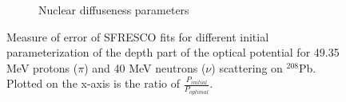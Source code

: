 \begin{figure}[h]
\begin{subfigure}{0.5\textwidth}
		\caption{Nuclear diffuseness parameters  }
		\label{fig:pna}
	\end{subfigure}
	\caption{Measure of error of SFRESCO fits for different initial parameterization of the depth part of the optical potential for 49.35 MeV protons ($\pi$) and 40 MeV neutrons ($\nu$) scattering on $^{208}$Pb. Plotted on the x-axis is the ratio of $\frac{P_{initial}}{P_{optimal}}$. }
	\label{fig:initializations}
\end{figure}